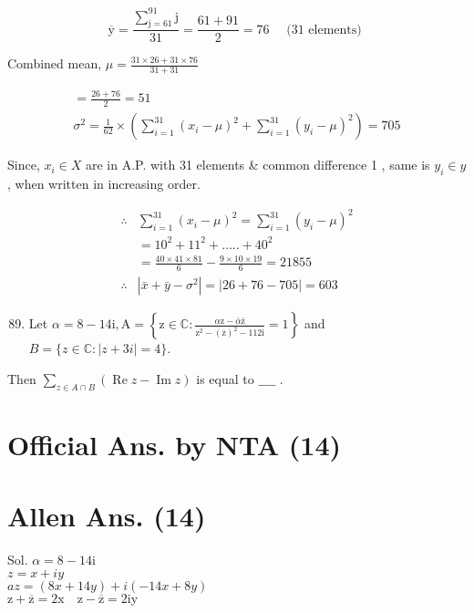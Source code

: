 \documentclass[10pt]{article}
\begin{document}
\[
\overline{\mathrm{y}}=\frac{\sum_{\mathrm{j}=61}^{91} \mathrm{j}}{31}=\frac{61+91}{2}=76 \quad \text { (31 elements) }
\]

Combined mean, \(\mu=\frac{31 \times 26+31 \times 76}{31+31}\)

\[
\begin{gathered}
=\frac{26+76}{2}=51 \\
\sigma^{2}=\frac{1}{62} \times\left(\sum_{i=1}^{31}\left(x_{i}-\mu\right)^{2}+\sum_{i=1}^{31}\left(y_{i}-\mu\right)^{2}\right)=705
\end{gathered}
\]

Since, \(x_{i} \in X\) are in A.P. with 31 elements \& common difference 1 , same is \(y_{i} \in y\), when written in increasing order.

\[
\begin{array}{ll}
\therefore & \sum_{i=1}^{31}\left(x_{i}-\mu\right)^{2}=\sum_{i=1}^{31}\left(y_{i}-\mu\right)^{2} \\
& =10^{2}+11^{2}+\ldots . .+40^{2} \\
& =\frac{40 \times 41 \times 81}{6}-\frac{9 \times 10 \times 19}{6}=21855 \\
\therefore & \left|\bar{x}+\bar{y}-\sigma^{2}\right|=|26+76-705|=603
\end{array}
\]

\begin{enumerate}
  \setcounter{enumi}{88}
  \item Let \(\alpha=8-14 \mathrm{i}, \mathrm{A}=\left\{\mathrm{z} \in \mathbb{C}: \frac{\alpha \mathrm{z}-\bar{\alpha} \overline{\mathrm{z}}}{\mathrm{z}^{2}-(\overline{\mathrm{z}})^{2}-112 \mathrm{i}}=1\right\}\) and \(B=\{z \in \mathbb{C}:|z+3 i|=4\}\).
\end{enumerate}

Then \(\sum_{z \in A \cap B}(\operatorname{Re} z-\operatorname{Im} z)\) is equal to \(\_\_\_\_\) .

\section*{Official Ans. by NTA (14)}
\section*{Allen Ans. (14)}
Sol. \(\alpha=8-14 \mathrm{i}\)\\
\(z=x+i y\)\\
\(a z=(8 x+14 y)+i(-14 x+8 y)\)\\
\(\mathrm{z}+\overline{\mathrm{z}}=2 \mathrm{x} \quad \mathrm{z}-\overline{\mathrm{z}}=2 \mathrm{iy}\)
\end{document}
